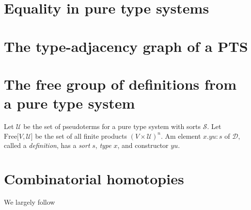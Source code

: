 \section{Equality in pure type systems}



\section{The type-adjacency graph of a PTS}

\section{The free group of definitions from a pure type system}

Let $\mathcal{U}$ be the set of pseudoterms for a pure type system with sorts $\mathcal{S}$. Let $\mathrm{Free}\lbrack V , \mathcal{U}\rbrack$ be the set of all finite products $(V \times \mathcal{U})^n$.
Am element $x . y u : s$ of $\mathcal{D}$, called a \emph{definition}, has a \emph{sort} $s$, \emph{type} $x$, and constructor $y u$. 



\section{Combinatorial homotopies}

We largely follow \cite{CombinatorialHomotopyLectures} %
